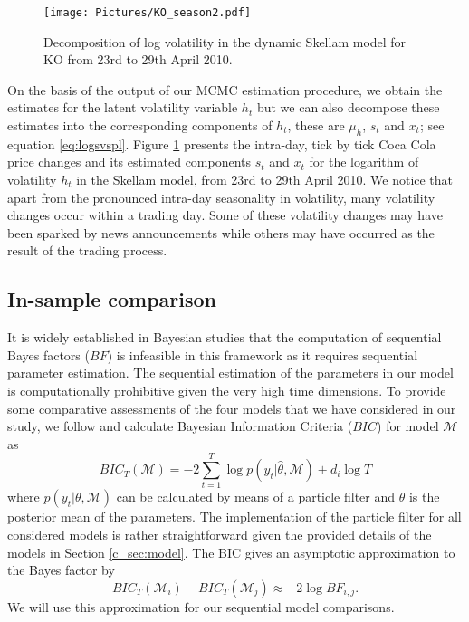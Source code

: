 \documentclass[12pt]{article}
\begin{document}
\begin{figure}[!htp]
  \centering 
\texttt{[image: Pictures/KO\_season2.pdf]}
       \caption{Decomposition of log volatility in the dynamic Skellam model for KO from 23rd to 29th April 2010.}
 \label{c_pic:KO_season}
 \end{figure}
 
On the basis of the output of our MCMC estimation procedure,
we obtain the estimates for the latent volatility variable $h_t$ but we
can also decompose these estimates into
the corresponding components of $h_t$, these are $\mu_{h}$, $s_t$ and $x_t$; see equation
\eqref{eq:logsvspl}.
Figure \ref{c_pic:KO_season} presents the intra-day, tick by tick Coca Cola price changes
and its estimated components $s_t$ and $x_t$ 
for the logarithm of volatility $h_t$ in the Skellam model,
from 23rd to 29th April 2010.
We notice that apart from the pronounced intra-day seasonality in volatility, many
volatility changes occur within a trading day. Some of these volatility
changes may have been sparked by news announcements while others may have occurred as
the result of the trading process.
 

\subsection{In-sample comparison}

It is widely established in Bayesian studies that the computation of sequential  Bayes factors ($BF$) is infeasible
in this framework as it requires sequential parameter estimation.
The sequential estimation of the parameters in our model is computationally
prohibitive given the very high time dimensions.
To provide some comparative assessments of the four models that we have considered in
our study, we follow \citet{JohannesStroud2014} and calculate Bayesian Information
Criteria ($BIC$) for model $\mathcal{M}$ as
\begin{equation}
BIC_{T}(\mathcal{M})=-2\sum \limits_{t=1}^{T} \log p(y_t|\hat{\theta},\mathcal{M})+d_i \log T 
\end{equation} 
where $ p(y_t|\theta,\mathcal{M})$ can be calculated by means of a particle filter and 
$\hat{\theta}$ is the posterior mean of the parameters.
The implementation of the particle filter for all considered models is rather
straightforward given the provided details of the models in Section \ref{c_sec:model}.
The BIC gives an asymptotic approximation to the Bayes
factor by
\[
BIC_{T}(\mathcal{M}_i)-BIC_{T}(\mathcal{M}_j)\approx -2 \log BF_{i,j}.
\]
We will use this approximation for our sequential model comparisons. 
\end{document}
